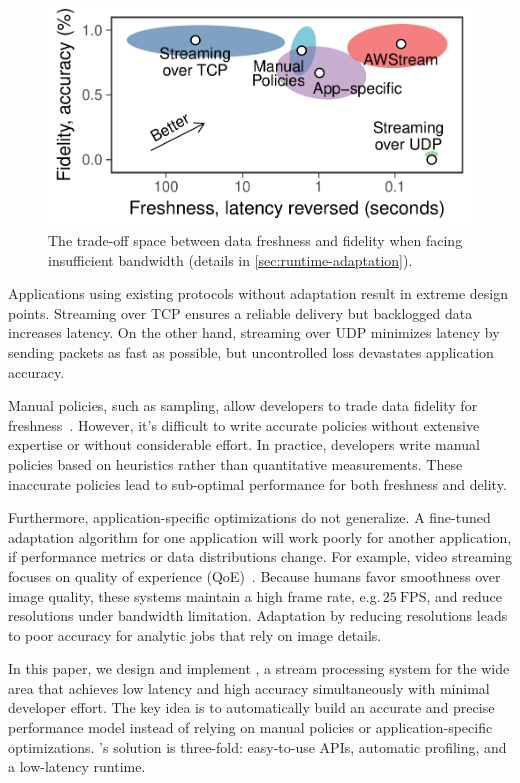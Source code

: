 \begin{figure}
  \centering
  \includegraphics[width=0.8\columnwidth]{figures/figure1.pdf}
  \caption{The trade-off space between data freshness and fidelity when facing
    insufficient bandwidth (details in \autoref{sec:runtime-adaptation}).}
  \label{fig:intro}
  \vspace{-1em}
\end{figure}

Applications using existing protocols without adaptation result in extreme
design points. Streaming over TCP ensures a reliable delivery but backlogged
data increases latency. On the other hand, streaming over UDP minimizes latency
by sending packets as fast as possible, but uncontrolled loss devastates
application accuracy.

Manual policies, such as sampling, allow developers to trade data fidelity for
freshness~\cite{rabkin2014aggregation}. However, it's difficult to write
accurate policies without extensive expertise or without considerable effort. In
practice, developers write manual policies based on heuristics rather than
quantitative measurements. These inaccurate policies lead to sub-optimal
performance for both freshness and delity.

Furthermore, application-specific optimizations do not generalize. A fine-tuned
adaptation algorithm for one application will work poorly for another
application, if performance metrics or data distributions change.  For example,
video streaming focuses on quality of experience
(QoE)~\cite{michalos2012dynamic, pantos2016http, yin2015control}. Because humans
favor smoothness over image quality, these systems maintain a high frame rate,
e.g.\,\(25~\text{FPS}\), and reduce resolutions under bandwidth limitation.
Adaptation by reducing resolutions leads to poor accuracy for analytic jobs that
rely on image details.

In this paper, we design and implement \sysname{}, a stream processing system
for the wide area that achieves low latency and high accuracy simultaneously
with minimal developer effort. The key idea is to automatically build an
accurate and precise performance model instead of relying on manual policies or
application-specific optimizations. \sysname{}'s solution is three-fold:
easy-to-use APIs, automatic profiling, and a low-latency runtime.

